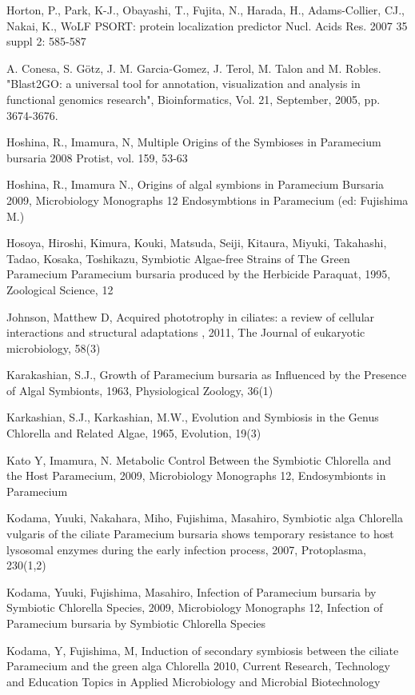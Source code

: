  
\noindent Horton, P., Park, K-J., Obayashi, T., Fujita, N., Harada, H., Adams-Collier, CJ., Nakai, K., WoLF PSORT: protein localization predictor Nucl. Acids Res. 2007 35 suppl 2: 585-587

 
\noindent A. Conesa, S. Götz, J. M. Garcia-Gomez, J. Terol, M. Talon and M. Robles. "Blast2GO: a universal tool for annotation, visualization and analysis in functional genomics research", Bioinformatics, Vol. 21, September, 2005, pp. 3674-3676.

 
\noindent Hoshina, R., Imamura, N,  Multiple Origins of the Symbioses in Paramecium bursaria 2008 Protist, vol. 159, 53-63

 
\noindent Hoshina, R., Imamura N., Origins of algal symbions in Paramecium Bursaria 2009, Microbiology Monographs 12 Endosymbtions in Paramecium (ed: Fujishima M.)

 
\noindent Hosoya, Hiroshi,  Kimura, Kouki, Matsuda, Seiji, Kitaura, Miyuki,  Takahashi, Tadao, Kosaka, Toshikazu, Symbiotic Algae-free Strains of The Green Paramecium Paramecium bursaria produced by the Herbicide Paraquat, 1995, Zoological Science, 12

 
\noindent Johnson, Matthew D,  Acquired phototrophy in ciliates: a review of cellular interactions and structural adaptations , 2011, The Journal of eukaryotic microbiology, 58(3)

 
\noindent Karakashian, S.J., Growth of Paramecium bursaria as Influenced by the Presence of Algal Symbionts, 1963,  Physiological Zoology, 36(1)

 
\noindent Karkashian, S.J.,  Karkashian, M.W., Evolution and Symbiosis in the Genus Chlorella and Related Algae, 1965, Evolution,  19(3)

 
\noindent Kato Y, Imamura, N. Metabolic Control Between the Symbiotic Chlorella and the Host Paramecium, 2009,  Microbiology Monographs 12,  Endosymbionts in Paramecium

 
\noindent Kodama, Yuuki, Nakahara, Miho, Fujishima, Masahiro,  Symbiotic alga Chlorella vulgaris of the ciliate Paramecium bursaria shows temporary resistance to host lysosomal enzymes during the early infection process, 2007, Protoplasma, 230(1,2)

 
\noindent Kodama, Yuuki, Fujishima, Masahiro, Infection of Paramecium bursaria by Symbiotic Chlorella Species, 2009, Microbiology Monographs 12,  Infection of Paramecium bursaria by Symbiotic Chlorella Species

 
\noindent Kodama, Y, Fujishima, M,  Induction of secondary symbiosis between the ciliate Paramecium and the green alga Chlorella 2010,  Current Research, Technology and Education Topics in Applied Microbiology and Microbial Biotechnology

